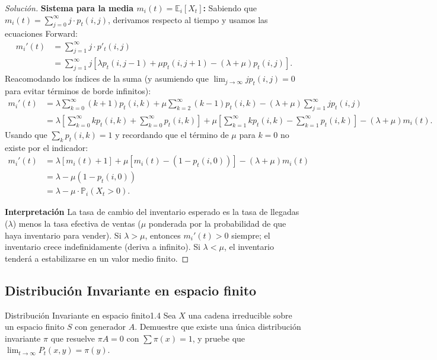 \documentclass[10pt,a4paper]{article}
\begin{document}
\begin{proof}[Solución]
    \textbf{Sistema para la media $m_i(t) = \mathbb{E}_i[X_t]$:}
    Sabiendo que $m_i(t) = \sum_{j=0}^\infty j \cdot p_t(i,j)$, derivamos respecto al tiempo y usamos las ecuaciones Forward:
    \begin{align*}
        m_i'(t) &= \sum_{j=1}^\infty j \cdot p'_t(i,j) \\
        &= \sum_{j=1}^\infty j [\lambda p_t(i, j-1) + \mu p_t(i, j+1) - (\lambda + \mu) p_t(i,j)].
    \end{align*}
    Reacomodando los índices de la suma (y asumiendo que $\lim_{j \to \infty} j p_t(i,j) = 0$ para evitar términos de borde infinitos):
    \begin{align*}
        m_i'(t) &= \lambda \sum_{k=0}^\infty (k+1)p_t(i,k) + \mu \sum_{k=2}^\infty (k-1)p_t(i,k) - (\lambda+\mu)\sum_{j=1}^\infty j p_t(i,j) \\
        &= \lambda \left[ \sum_{k=0}^\infty k p_t(i,k) + \sum_{k=0}^\infty p_t(i,k) \right] + \mu \left[ \sum_{k=1}^\infty k p_t(i,k) - \sum_{k=1}^\infty p_t(i,k) \right] - (\lambda+\mu)m_i(t).
    \end{align*}
    Usando que $\sum_k p_t(i,k) = 1$ y recordando que el término de $\mu$ para $k=0$ no existe por el indicador:
    \begin{align*}
        m_i'(t) &= \lambda [m_i(t) + 1] + \mu [m_i(t) - (1 - p_t(i,0))] - (\lambda+\mu)m_i(t) \\
        &= \lambda - \mu(1 - p_t(i,0)) \\
        &= \lambda - \mu \cdot \mathbb{P}_i(X_t > 0).
    \end{align*}

    \textbf{Interpretación }
    La tasa de cambio del inventario esperado es la tasa de llegadas ($\lambda$) menos la tasa efectiva de ventas ($\mu$ ponderada por la probabilidad de que haya inventario para vender).
    Si $\lambda > \mu$, entonces $m_i'(t) > 0$ siempre; el inventario crece indefinidamente (deriva a infinito). Si $\lambda < \mu$, el inventario tenderá a estabilizarse en un valor medio finito.
\end{proof}

\newpage
\subsection{Distribución Invariante en espacio finito}

\begin{ejercicio}{Distribución Invariante en espacio finito}{1.4}
    Sea $X$ una cadena irreducible sobre un espacio finito $S$ con generador $A$. Demuestre que existe una única distribución invariante $\pi$ que resuelve $\pi A = 0$ con $\sum \pi(x) = 1$, y pruebe que $\lim_{t\to\infty} P_t(x,y) = \pi(y)$.
\end{ejercicio}
\end{document}
